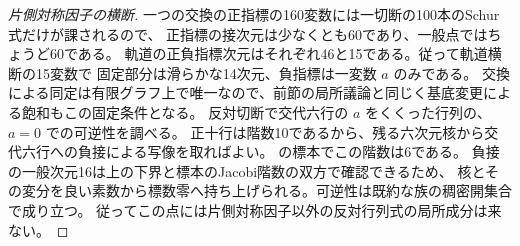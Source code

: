 \begin{proof}[片側対称因子の横断]
一つの交換の正指標の160変数には一切断の100本のSchur式だけが課されるので、
正指標の接次元は少なくとも60であり、一般点ではちょうど60である。
軌道の正負指標次元はそれぞれ46と15である。従って軌道横断の15変数で
固定部分は滑らかな14次元、負指標は一変数 $a$ のみである。
交換による同定は有限グラフ上で唯一なので、前節の局所議論と同じく基底変更による飽和もこの固定条件となる。
反対切断で交代六行の $a$ をくくった行列の、$a=0$ での可逆性を調べる。
正十行は階数10であるから、残る六次元核から交代六行への負接による写像を取ればよい。
の標本でこの階数は6である。
負接の一般次元16は上の下界と標本のJacobi階数の双方で確認できるため、
核とその変分を良い素数から標数零へ持ち上げられる。可逆性は既約な族の稠密開集合で成り立つ。
従ってこの点には片側対称因子以外の反対行列式の局所成分は来ない。
\end{proof}

